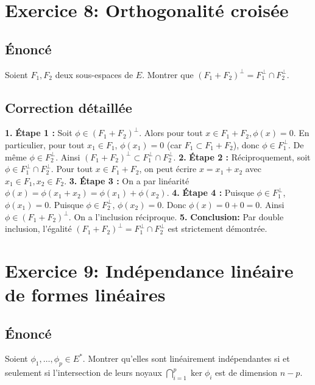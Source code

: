 \documentclass[12pt,a4paper]{report}
\begin{document}
\newpage
\chapter{Exercice 8: Orthogonalité croisée}
\section{Énoncé}
Soient $F_1, F_2$ deux sous-espaces de $E$. Montrer que $(F_1 + F_2)^\perp = F_1^\perp \cap F_2^\perp$.

\section{Correction détaillée}
\textbf{1.} \textbf{Étape 1 :} Soit $\phi \in (F_1 + F_2)^\perp$. Alors pour tout $x \in F_1 + F_2, \phi(x)=0$.
   En particulier, pour tout $x_1 \in F_1$, $\phi(x_1)=0$ (car $F_1 \subset F_1+F_2$), donc $\phi \in F_1^\perp$.
   De même $\phi \in F_2^\perp$. Ainsi $(F_1 + F_2)^\perp \subset F_1^\perp \cap F_2^\perp$.
\textbf{2.} \textbf{Étape 2 :} Réciproquement, soit $\phi \in F_1^\perp \cap F_2^\perp$. Pour tout $x \in F_1+F_2$, on peut écrire $x = x_1 + x_2$ avec $x_1 \in F_1, x_2 \in F_2$.
\textbf{3.} \textbf{Étape 3 :} On a par linéarité $\phi(x) = \phi(x_1+x_2) = \phi(x_1) + \phi(x_2)$.
\textbf{4.} \textbf{Étape 4 :} Puisque $\phi \in F_1^\perp$, $\phi(x_1)=0$. Puisque $\phi \in F_2^\perp$, $\phi(x_2)=0$. Donc $\phi(x) = 0 + 0 = 0$. Ainsi $\phi \in (F_1+F_2)^\perp$. On a l'inclusion réciproque.
\textbf{5.} \textbf{Conclusion:} Par double inclusion, l'égalité $(F_1 + F_2)^\perp = F_1^\perp \cap F_2^\perp$ est strictement démontrée.

\newpage
\chapter{Exercice 9: Indépendance linéaire de formes linéaires}
\section{Énoncé}
Soient $\phi_1, \dots, \phi_p \in E^*$. Montrer qu'elles sont linéairement indépendantes si et seulement si l'intersection de leurs noyaux $\bigcap_{i=1}^p \ker \phi_i$ est de dimension $n-p$.
\end{document}
